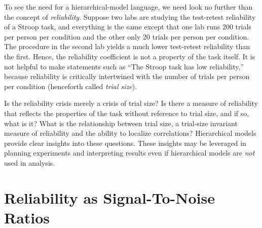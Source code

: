 \documentclass[
  ,man]{apa6}
\begin{document}
To see the need for a hierarchical-model language, we need look no further than the concept of \emph{reliability}. Suppose two labs are studying the test-retest reliability of a Stroop task, and everything is the same except that one lab runs 200 trials per person per condition and the other only 20 trials per person per condition. The procedure in the second lab yields a much lower test-retest reliability than the first. Hence, the reliability coefficient is not a property of the task itself. It is not helpful to make statements such as ``The Stroop task has low reliability,'' because reliability is critically intertwined with the number of trials per person per condition (henceforth called \emph{trial size}).

Is the reliability crisis merely a crisis of trial size? Is there a measure of reliability that reflects the properties of the task without reference to trial size, and if so, what is it? What is the relationship between trial size, a trial-size invariant measure of reliability and the ability to localize correlations? Hierarchical models provide clear insights into these questions. These insights may be leveraged in planning experiments and interpreting results even if hierarchical models are \emph{not} used in analysis.

\hypertarget{reliability-as-signal-to-noise-ratios}{%
\section{Reliability as Signal-To-Noise Ratios}\label{reliability-as-signal-to-noise-ratios}}
\end{document}
